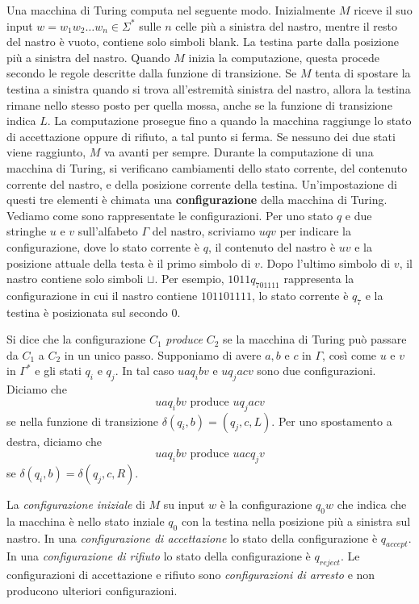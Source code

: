 \documentclass[12pt]{report}
\begin{document}
Una macchina di Turing computa nel seguente modo. Inizialmente $M$ riceve il suo input $w = w_1w_2\dots w_n \in \Sigma^*$ sulle $n$ celle più a sinistra del nastro, mentre il resto del nastro è vuoto, contiene solo simboli blank. La testina parte dalla posizione più a sinistra del nastro. Quando $M$ inizia la computazione, questa procede secondo le regole descritte dalla funzione di transizione. Se $M$ tenta di spostare la testina a sinistra quando si trova all'estremità sinistra del nastro, allora la testina rimane nello stesso posto per quella mossa, anche se la funzione di transizione indica $L$. La computazione prosegue fino a quando la macchina raggiunge lo stato di accettazione oppure di rifiuto, a tal punto si ferma. Se nessuno dei due stati viene raggiunto, $M$ va avanti per sempre. Durante la computazione di una macchina di Turing, si verificano cambiamenti dello stato corrente, del contenuto corrente del nastro, e della posizione corrente della testina. Un'impostazione di questi tre elementi è chimata una \textbf{configurazione} della macchina di Turing. Vediamo come sono rappresentate le configurazioni. Per uno stato $q$ e  due stringhe $u$ e $v$ sull'alfabeto $\Gamma$ del nastro, scriviamo $uqv$ per indicare la configurazione, dove lo stato corrente è $q$, il contenuto del nastro è $uv$ e la posizione attuale della testa è il primo simbolo di $v$. Dopo l'ultimo simbolo di $v$, il nastro contiene solo simboli $\sqcup$. Per esempio, $1011q_701111$ rappresenta la configurazione in cui il nastro contiene $101101111$, lo stato corrente è $q_7$ e la testina è posizionata sul secondo 0.

Si dice che la configurazione $C_1$ \textit{produce} $C_2$ se la macchina di Turing può passare da $C_1$ a $C_2$ in un unico passo. Supponiamo di avere $a, b$ e $c$ in $\Gamma$, così come $u$ e $v$ in $\Gamma^*$ e gli stati $q_i$ e $q_j$. In tal caso $uaq_ibv$ e $uq_jacv$ sono due configurazioni. Diciamo che
\[
uaq_ibv \text{ produce } uq_jacv
\]
se nella funzione di transizione $\delta(q_i, b) = (q_j, c, L)$. Per uno spostamento a destra, diciamo che
\[
uaq_ibv \text{ produce } uacq_jv
\]
se $\delta(q_i, b) = \delta(q_j, c, R)$.

La \textit{configurazione iniziale} di $M$ su input $w$ è la configurazione $q_0w$ che indica che la macchina è nello stato inziale $q_0$ con la testina nella posizione più a sinistra sul nastro. In una \textit{configurazione di accettazione} lo stato della configurazione è $q_{accept}$. In una \textit{configurazione di rifiuto} lo stato della configurazione è $q_{reject}$. Le configurazioni di accettazione e rifiuto sono \textit{configurazioni di arresto} e non producono ulteriori configurazioni.
\end{document}
